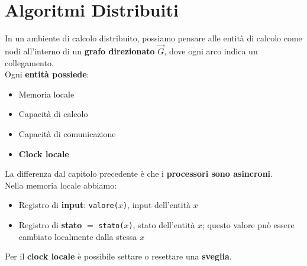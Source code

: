 

\section{Algoritmi Distribuiti}

In un ambiente di calcolo distribuito, possiamo pensare alle entità di calcolo come nodi all'interno di un \textbf{grafo direzionato} $\vec G$, dove ogni arco indica un collegamento.\\

Ogni \textbf{entità possiede}:
\begin{itemize}
	\item Memoria locale
	\item Capacità di calcolo 
	\item Capacità di comunicazione
	\item \textbf{Clock locale}
\end{itemize} 

La differenza dal capitolo precedente è che i \textbf{processori sono asincroni}.\\

Nella memoria locale abbiamo: 
\begin{itemize}
	\item Registro di \textbf{input}: \texttt{valore($x$)}, input dell'entità $x$
	\item Registro di \textbf{stato} $=$ \texttt{stato($x$)}, stato dell'entità $x$; questo valore può essere cambiato localmente dalla stessa $x$
\end{itemize}

Per il \textbf{clock locale} è possibile settare o resettare una \textbf{sveglia}.\\
 \newpage

